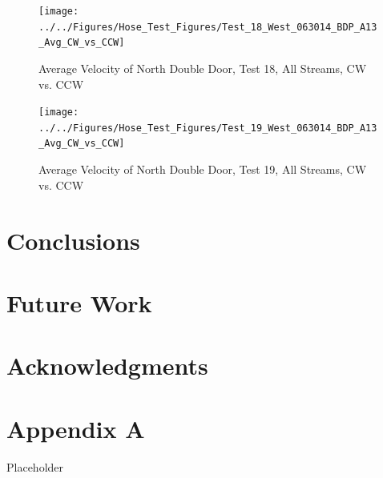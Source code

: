 \documentclass[12pt,oneside]{book}
\begin{document}
\clearpage

\begin{figure}[!ht]
\texttt{[image: ../../Figures/Hose\_Test\_Figures/Test\_18\_West\_063014\_BDP\_A13\_Avg\_CW\_vs\_CCW]}
\caption{Average Velocity of North Double Door, Test 18, All Streams, CW vs. CCW}
\label{fig:Test_18_BDP_A13_Avg_CW_vs_CCW}
\end{figure}

\clearpage

\begin{figure}[!ht]
\texttt{[image: ../../Figures/Hose\_Test\_Figures/Test\_19\_West\_063014\_BDP\_A13\_Avg\_CW\_vs\_CCW]}
\caption{Average Velocity of North Double Door, Test 19, All Streams, CW vs. CCW}
\label{fig:Test_19_BDP_A13_Avg_CW_vs_CCW}
\end{figure}

\clearpage

\chapter{Conclusions}
\label{chap:Conclusions}

\chapter{Future Work}
\label{chap:Future_Work}

\chapter{Acknowledgments}
\label{chap:Acknowledgments}



\appendix

\chapter{Appendix A}

Placeholder
\end{document}
